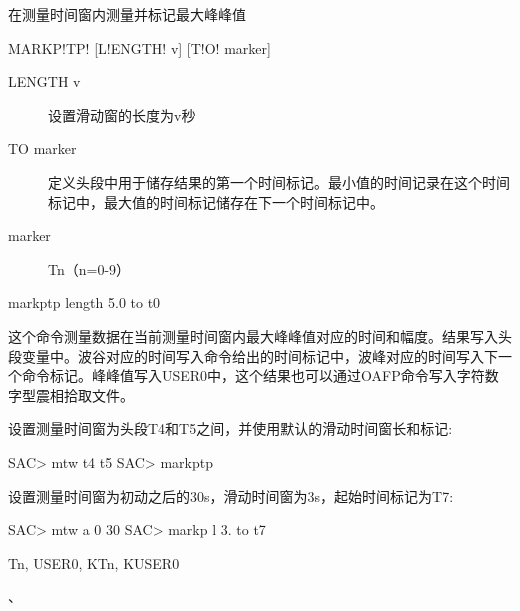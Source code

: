 \label{cmd:markptp}

在测量时间窗内测量并标记最大峰峰值

\begin{SACSTX}
MARKP!TP! [L!ENGTH! v] [T!O! marker]
\end{SACSTX}

\begin{description}
\item [LENGTH v] 设置滑动窗的长度为v秒 
\item [TO marker] 定义头段中用于储存结果的第一个时间标记。最小值的时间记录在这个时间标记中，最大值的时间标记储存在下一个时间标记中。 
\item [marker] Tn（n=0-9）
\end{description}

\begin{SACDFT}
markptp length 5.0 to t0
\end{SACDFT}

这个命令测量数据在当前测量时间窗内最大峰峰值对应的时间和幅度。结果写入头段变量中。波谷对应的时间写入命令给出的时间标记中，波峰对应的时间写入下一个命令标记。峰峰值写入USER0中，这个结果也可以通过OAFP命令写入字符数字型震相拾取文件。

设置测量时间窗为头段T4和T5之间，并使用默认的滑动时间窗长和标记:
\begin{SACCode}
SAC> mtw t4 t5
SAC> markptp
\end{SACCode}

设置测量时间窗为初动之后的30s，滑动时间窗为3s，起始时间标记为T7:
\begin{SACCode}
SAC> mtw a 0 30
SAC> markp l 3. to t7
\end{SACCode}

Tn, USER0, KTn, KUSER0

、
